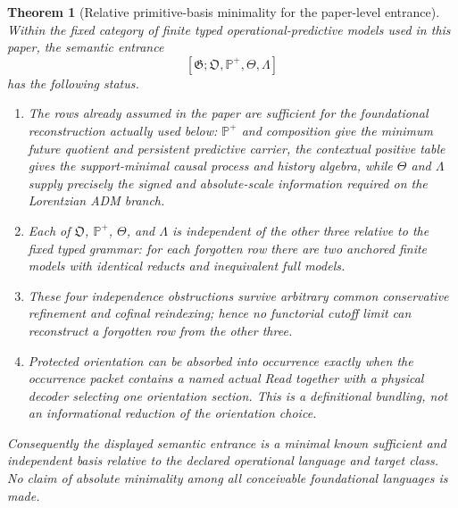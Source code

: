\documentclass[11pt]{article}
\newtheorem{theorem}{Theorem}[section]
\theoremstyle{definition}
\theoremstyle{remark}
\begin{document}
\begin{theorem}[Relative primitive-basis minimality for the paper-level entrance]
\label{thm:supp-relative-primitive-floor}
Within the fixed category of finite typed operational-predictive models used in
this paper, the semantic entrance
\begin{equation}
 \boxed{
 [\mathfrak G;\mathfrak O,\mathbb P^+,\Theta,\Lambda]}
 \label{eq:supp-relative-floor}
\end{equation}
has the following status.
\begin{enumerate}[label=\textup{(R\arabic*)},leftmargin=3em]
\item The rows already assumed in the paper are sufficient for the foundational
      reconstruction actually used below: $\mathbb P^+$ and composition give
      the minimum future quotient and persistent predictive carrier, the
      contextual positive table gives the support-minimal causal process and
      history algebra, while $\Theta$ and $\Lambda$ supply precisely the signed
      and absolute-scale information required on the Lorentzian ADM branch.
\item Each of $\mathfrak O$, $\mathbb P^+$, $\Theta$, and $\Lambda$ is
      independent of the other three relative to the fixed typed grammar: for
      each forgotten row there are two anchored finite models with identical
      reducts and inequivalent full models.
\item These four independence obstructions survive arbitrary common
      conservative refinement and cofinal reindexing; hence no functorial
      cutoff limit can reconstruct a forgotten row from the other three.
\item Protected orientation can be absorbed into occurrence exactly when the
      occurrence packet contains a named actual Read together with a physical
      decoder selecting one orientation section.  This is a definitional
      bundling, not an informational reduction of the orientation choice.
\end{enumerate}
Consequently the displayed semantic entrance is a minimal known sufficient and
independent basis relative to the declared operational language and target
class.  No claim of absolute minimality among all conceivable foundational
languages is made.
\end{theorem}
\end{document}
